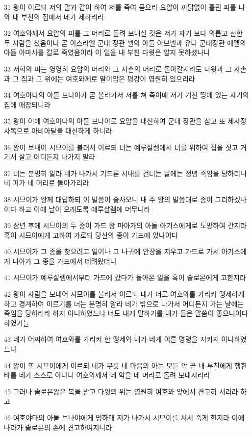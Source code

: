 \par 31 왕이 이르되 저의 말과 같이 하여 저를 죽여 묻으라 요압이 까닭없이 흘린 피를 나와 내 부친의 집에서 네가 제하리라
\par 32 여호와께서 요압의 피를 그 머리로 돌려 보내실 것은 저가 자기 보다 의롭고 선한 두 사람을 쳤음이니 곧 이스라엘 군대 장관 넬의 아들 아브넬과 유다 군대장관 예델의 아들 아마사를 칼로 죽였음이라 이 일을 내 부친 다윗은 알지 못하셨나니
\par 33 저희의 피는 영영히 요압의 머리와 그 자손의 머리로 돌아갈지라도 다윗과 그 자손과 그 집과 그 위에는 여호와께로 말미암은 평강이 영원히 있으리라
\par 34 여호야다의 아들 브나야가 곧 올라가서 저를 쳐 죽이매 저가 거친 땅에 있는 자기의 집에 매장되니라
\par 35 왕이 이에 여호야다의 아들 브나야로 요압을 대신하여 군대 장관을 삼고 또 제사장 사독으로 아비아달을 대신하게 하니라
\par 36 왕이 보내어 시므이를 불러서 이르되 너는 예루살렘에서 너를 위하여 집을 짓고 거기서 살고 어디든지 나가지 말라
\par 37 너는 분명히 알라 네가 나가서 기드론 시내를 건너는 날에는 정녕 죽임을 당하리니 네 피가 네 머리로 돌아가리라
\par 38 시므이가 왕께 대답하되 이 말씀이 좋사오니 내 주 왕의 말씀대로 종이 그리하겠나이다 하고 이에 날이 오래도록 예루살렘에 머무니라
\par 39 삼년 후에 시므이의 두 종이 가드 왕 마아가의 아들 아기스에게로 도망하여 간지라 혹이 시므이에게 고하여 가로되 당신의 종이 가드에 있나이다
\par 40 시므이가 그 종을 찾으려고 일어나 그 나귀에 안장을 지우고 가드로 가서 아기스에게 나아가 그 종을 가드에서 데려왔더니
\par 41 시므이가 예루살렘에서부터 가드에 갔다가 돌아온 일을 혹이 솔로몬에게 고한지라
\par 42 왕이 사람을 보내어 시므이를 불러서 이르되 내가 너로 여호와를 가리켜 맹세하게 하고 경계하여 이르기를 너는 분명히 알라 네가 밖으로 나가서 어디든지 가는 날에는 죽임을 당하리라 하지 아니하였느냐 너도 내게 말하기를 내가 들은 말씀이 좋으니이다 하였거늘
\par 43 네가 어찌하여 여호와를 가리켜 한 맹세와 내가 네게 이른 명령을 지키지 아니하였느냐
\par 44 왕이 또 시므이에게 이르되 네가 무릇 네 마음의 아는 모든 악 곧 내 부친에게 행한 바를 네가 스스로 아나니 여호와께서 네 악을 네 머리로 돌려 보내시리라
\par 45 그러나 솔로몬왕은 복을 받고 다윗의 위는 영원히 여호와 앞에서 견고히 서리라 하고
\par 46 여호야다의 아들 브나야에게 명하매 저가 나가서 시므이를 쳐서 죽게 한지라 이에 나라가 솔로몬의 손에 견고하여지니라

